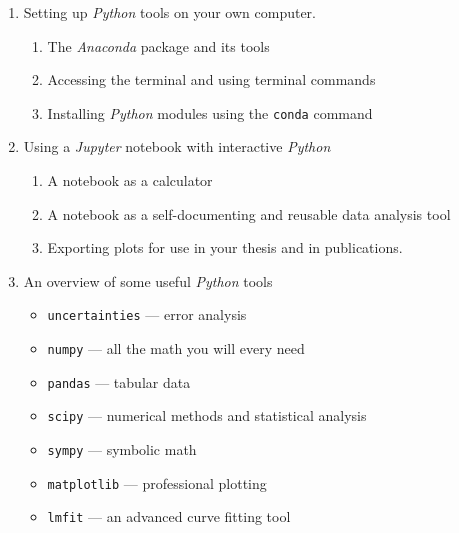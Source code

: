 \documentclass{tufte-handout}
\begin{document}
\begin{enumerate}

\item Setting up \textit{Python} tools on your own computer. 

\begin{enumerate}

\item The \textit{Anaconda} package and its tools

\item Accessing the terminal and using terminal commands

\item Installing \textit{Python} modules using the \texttt{conda} command

\end{enumerate}

\item Using a \textit{Jupyter} notebook with interactive \textit{Python}

\begin{enumerate}

\item A notebook as a calculator

\item A notebook as a self-documenting and reusable data analysis tool

\item Exporting plots for use in your thesis and in publications.

\end{enumerate}

\item An overview of some useful \textit{Python} tools

\begin{itemize}
\item \texttt{uncertainties} --- error analysis
\item \texttt{numpy} --- all the math you will every need
\item \texttt{pandas} --- tabular data
\item \texttt{scipy} --- numerical methods and statistical analysis
\item \texttt{sympy} --- symbolic math
\item \texttt{matplotlib} --- professional plotting
\item \texttt{lmfit} --- an advanced curve fitting tool 

\end{itemize}

\end{enumerate}



\nobibliography{}
\end{document}
